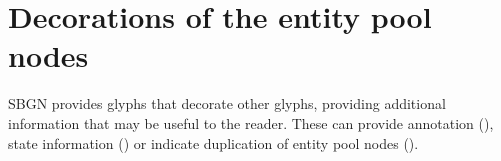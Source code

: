 







\section{Decorations of the entity pool nodes}\label{sec:decorations}

SBGN \PD provides glyphs that decorate other glyphs, providing additional information that may be useful to the reader. These can provide annotation (), state information () or indicate duplication of entity pool nodes ().



% 

% 

% 


% 
% 
% 
% 
% 
% 

